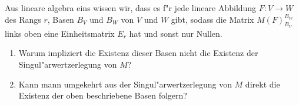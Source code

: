 \documentclass[a4,11pt]{article}
\begin{document}
\vspace*{-17mm}
{
\kopf
}



\begin{aufgabe}[4 Punkte]
Aus lineare algebra eins wissen wir, dass es f"r jede lineare Abbildung $F : V \to W$ des Rangs $r$, Basen $B_V$ und $B_W$ von $V$ und $W$ gibt, sodass die Matrix $M(F)_{B_V}^{B_W}$ links oben eine Einheitsmatrix $E_r$ hat und sonst nur Nullen. 
\begin{enumerate}
\item
Warum impliziert die Existenz dieser Basen nicht die Existenz der Singul"arwertzerlegung von $M$?
\item
Kann mann umgekehrt aus der Singul"arwertzerlegung von $M$ direkt die Existenz der oben beschriebene Basen folgern?
\end{enumerate}
\end{aufgabe}
\end{document}
